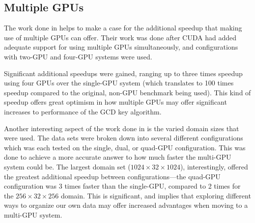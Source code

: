 \documentclass[smallextended]{svjour3}       %
\begin{document}
\subsection{Multiple GPUs}
\label{subsec:muliGPU}
%

The work done in \cite{thibault2009cuda} helps to make a case for the
additional speedup that making use of multiple GPUs can offer. Their work was
done after CUDA had added adequate support for using multiple GPUs
simultaneously, and configurations with two-GPU and four-GPU systems were used.

Significant additional speedups were gained, ranging up to three times speedup
using four GPUs over the single-GPU system (which translates to 100 times
speedup compared to the original, non-GPU benchmark being used). This kind of
speedup offers great optimism in how multiple GPUs may offer significant
increases to performance of the GCD key algorithm.

Another interesting aspect of the work done in \cite{thibault2009cuda} is the
varied domain sizes that were used. The data sets were broken down into several
different configurations which was each tested on the single, dual, or quad-GPU
configuration. This was done to achieve a more accurate answer to how much
faster the multi-GPU system could be. The largest domain set
($1024\times32\times1024$), interestingly, offered the greatest additional
speedup between configurations---the quad-GPU configuration was 3 times faster
than the single-GPU, compared to 2 times for the $256\times32\times256$
domain. This is significant, and implies that exploring different ways to
organize our own data may offer increased advantages when moving to a multi-GPU
system.
\end{document}
